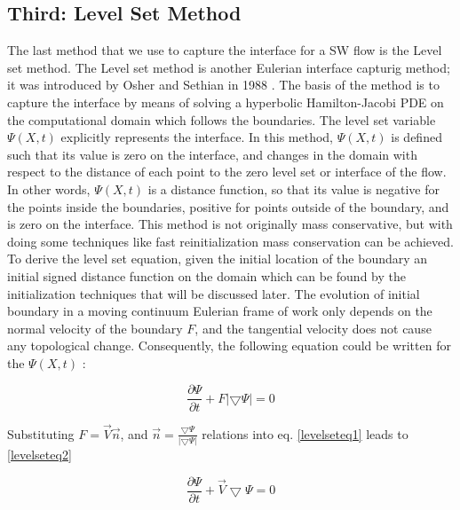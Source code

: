 \documentclass[letterpaper,10pt]{article}
\begin{document}
\subsection{Third: Level Set Method} \label{level set}

The last method that we use to capture the interface for a SW flow is the Level set method.
The Level set method is another Eulerian interface capturig method; it was introduced by Osher and Sethian in 1988 \cite{Osher1988}.
The basis of the method is to capture the interface by means of solving a hyperbolic Hamilton-Jacobi PDE on 
the computational domain which follows the boundaries. The level set variable $\varPsi (X,t)$ explicitly 
represents the interface. In this method, $\varPsi (X,t)$ is defined such that its value is zero on the interface, and 
changes in the domain with respect to the distance of each point to the zero level set or interface of the flow. 
In other words, $\varPsi (X,t)$  is a distance function, so that its value is negative for the points inside the boundaries, 
positive for points outside of the boundary, and is zero on the interface. 
This method is not originally mass conservative, but with doing some 
techniques like fast reinitialization mass conservation can be achieved. 
To derive the level set equation, given the initial location of the boundary an initial signed distance function on 
the domain which can be found by the initialization techniques that will be discussed later. The evolution of initial 
boundary in a moving continuum Eulerian frame of work only depends on the normal velocity of the boundary $F$, 
and the tangential velocity does not cause any topological change. Consequently, the following equation could 
be written for the $\varPsi (X,t)$ :

\begin{equation}\label{levelseteq1}
 \frac{\partial \varPsi}{\partial t} + F |\bigtriangledown \varPsi| = 0
\end{equation}

Substituting $F = \overrightarrow{V} \overrightarrow{n} $, and 
$\overrightarrow{n} = \frac{\bigtriangledown \varPsi}{|\bigtriangledown \varPsi|}$
relations into eq. \eqref{levelseteq1} leads to \eqref{levelseteq2}

\begin{equation}\label{levelseteq2}
 \frac{\partial \varPsi}{\partial t} + \overrightarrow{V} \bigtriangledown \varPsi = 0
\end{equation}
\end{document}
